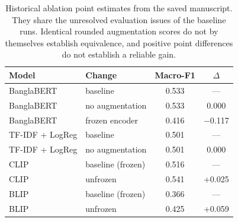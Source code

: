 \documentclass[11pt]{article}
\begin{document}
\begin{table}[ht]
\footnotesize
\setlength{\tabcolsep}{3pt}
\centering
\caption{Historical ablation point estimates from the saved manuscript. They share the unresolved evaluation issues of the baseline runs. Identical rounded augmentation scores do not by themselves establish equivalence, and positive point differences do not establish a reliable gain.}
\begin{tabular}{|l|l|c|c|}
\hline
\textbf{Model} & \textbf{Change} & \textbf{Macro-F1} & \textbf{$\Delta$} \\
\hline
BanglaBERT         & baseline          & 0.533 & --- \\
BanglaBERT         & no augmentation   & 0.533 & 0.000 \\
BanglaBERT         & frozen encoder    & 0.416 & $-$0.117 \\
\hline
TF-IDF + LogReg    & baseline          & 0.501 & --- \\
TF-IDF + LogReg    & no augmentation   & 0.501 & 0.000 \\
\hline
CLIP               & baseline (frozen) & 0.516 & --- \\
CLIP               & unfrozen          & 0.541 & +0.025 \\
\hline
BLIP               & baseline (frozen) & 0.366 & --- \\
BLIP               & unfrozen          & 0.425 & +0.059 \\
\hline
\end{tabular}
\label{tab:ablations}
\end{table}
\end{document}
